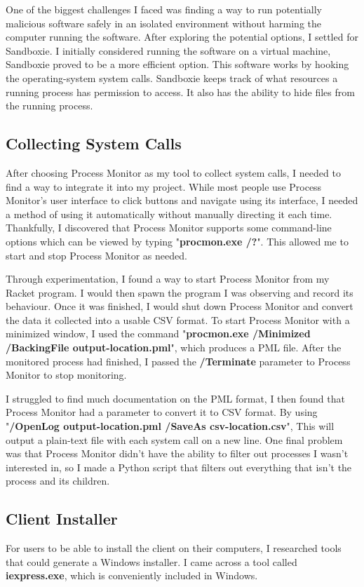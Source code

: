 One of the biggest challenges I faced was finding a way to
run potentially malicious software safely
in an isolated environment without harming the
computer running the software.
After exploring the potential options,
I settled for Sandboxie. \cite{sandboxie}
I initially considered running the software on a virtual machine,
Sandboxie proved to be a more efficient option.
This software works by hooking the operating-system system calls.
Sandboxie keeps track of what resources a running
process has permission to access.
It also has the ability to hide files from the running process.

\subsection{Collecting System Calls}
After choosing Process Monitor as my tool to collect system calls,
I needed to find a way to integrate it into my project.
While most people use Process Monitor's user interface
to click buttons and navigate using its interface,
I needed a method of using it automatically
without manually directing it each time.
Thankfully, I discovered that Process Monitor supports some command-line
options which can be viewed by typing "\textbf{procmon.exe /?}".
This allowed me to start and stop Process Monitor as needed.

Through experimentation, I found a way to start
Process Monitor from my Racket program.
I would then spawn the program I was observing and record its behaviour.
Once it was finished, I would shut down Process Monitor
and convert the data it collected into a usable CSV format.
To start Process Monitor with a minimized window,
I used the command
"\textbf{procmon.exe /Minimized /BackingFile output-location.pml}",
which produces a PML file. After the monitored process had finished,
I passed the
\textbf{/Terminate} parameter to Process Monitor to stop monitoring.

I struggled to find much documentation on the PML format,
I then found that Process Monitor had a parameter to convert it to CSV format.
By using "\textbf{/OpenLog output-location.pml /SaveAs csv-location.csv}",
This will output a plain-text file with each system call on a new line.
One final problem was that Process Monitor didn't have the ability
to filter out processes I wasn't interested in,
so I made a Python script that filters out everything that
isn't the process and its children.

\subsection{Client Installer}
For users to be able to install the client on their computers,
I researched tools that could generate a Windows installer.
I came across a tool called \textbf{iexpress.exe},
which is conveniently included in Windows.

